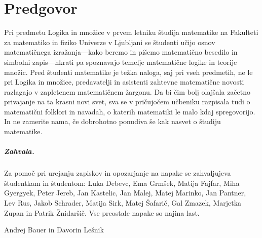 \chapter*{Predgovor}

Pri predmetu Logika in množice v prvem letniku študija matematike na Fakulteti za matematiko in fiziko Univerze v Ljubljani se študenti učijo osnov matematičnega izražanja---kako beremo in pišemo matematično besedilo in simbolni zapis---hkrati pa spoznavajo temelje matematične logike in teorije množic.
%
Pred študenti matematike je težka naloga, saj pri vseh predmetih, ne le pri Logika in množice, predavatelji in asistenti zahtevne matematične novosti razlagajo v zapletenem matematičnem žargonu.
%
Da bi čim bolj olajšala začetno privajanje na ta krasni novi svet, sva se v pričujočem učbeniku razpisala tudi o matematični folklori in navadah, o katerih matematiki le malo kdaj spregovorijo.
%
In ne zamerite nama, če dobrohotno ponudiva še kak nasvet o študiju matematike.


\paragraph{Zahvala.}
%
Za pomoč pri urejanju zapiskov in opozarjanje na napake se zahvaljujeva študentkam in študentom:
%
Luka Debevc,
Ema Grmšek,
Matija Fajfar,
Miha Gyergyek,
Peter Jereb,
Jan Kastelic,
Jan Malej,
Matej Marinko,
Jan Pantner,
Lev Rus,
Jakob Schrader,
Matija Sirk,
Matej Šafarič,
Gal Zmazek,
Marjetka Zupan in Patrik Žnidaršič.
%
Vse preostale napake so najina last.
\bigskip

\begin{flushright}
Andrej Bauer in Davorin Lešnik
\end{flushright}

\bigskip


